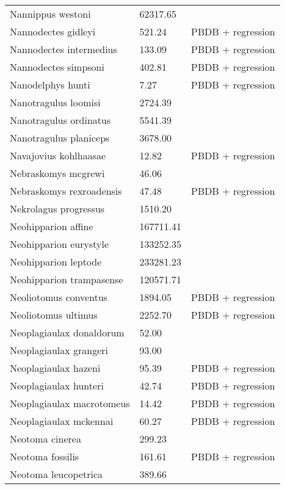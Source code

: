 \documentclass{article}
\begin{document}
\begin{center}
\begin{longtable}{p{} p{} p{} }
  Nannippus westoni & 62317.65 & \cite{Tomiya2013} \\ 
  Nannodectes gidleyi & 521.24 & PBDB + regression \\ 
  Nannodectes intermedius & 133.09 & PBDB + regression \\ 
  Nannodectes simpsoni & 402.81 & PBDB + regression \\ 
  Nanodelphys hunti & 7.27 & PBDB + regression \\ 
  Nanotragulus loomisi & 2724.39 & \cite{Tomiya2013} \\ 
  Nanotragulus ordinatus & 5541.39 & \cite{Tomiya2013} \\ 
  Nanotragulus planiceps & 3678.00 & \cite{McKenna2011} \\ 
  Navajovius kohlhaasae & 12.82 & PBDB + regression \\ 
  Nebraskomys mcgrewi & 46.06 & \cite{Tomiya2013} \\ 
  Nebraskomys rexroadensis & 47.48 & PBDB + regression \\ 
  Nekrolagus progressus & 1510.20 & \cite{Tomiya2013} \\ 
  Neohipparion affine & 167711.41 & \cite{Tomiya2013} \\ 
  Neohipparion eurystyle & 133252.35 & \cite{Tomiya2013} \\ 
  Neohipparion leptode & 233281.23 & \cite{Tomiya2013} \\ 
  Neohipparion trampasense & 120571.71 & \cite{Tomiya2013} \\ 
  Neoliotomus conventus & 1894.05 & PBDB + regression \\ 
  Neoliotomus ultimus & 2252.70 & PBDB + regression \\ 
  Neoplagiaulax donaldorum & 52.00 & \cite{Wilson2012} \\ 
  Neoplagiaulax grangeri & 93.00 & \cite{Wilson2012} \\ 
  Neoplagiaulax hazeni & 95.39 & PBDB + regression \\ 
  Neoplagiaulax hunteri & 42.74 & PBDB + regression \\ 
  Neoplagiaulax macrotomeus & 14.42 & PBDB + regression \\ 
  Neoplagiaulax mckennai & 60.27 & PBDB + regression \\ 
  Neotoma cinerea & 299.23 & \cite{Smith2004} \\ 
  Neotoma fossilis & 161.61 & PBDB + regression \\ 
  Neotoma leucopetrica & 389.66 & \cite{Grohe2010} \\ 

\end{longtable}
\end{center}
\end{document}
